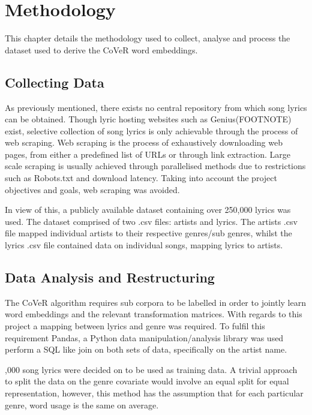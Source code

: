 \chapter{Methodology}
This chapter details the methodology used to collect, analyse and process the dataset used to derive the CoVeR word embeddings.
\label{chap:data_methodology}
\section{Collecting Data}
As previously mentioned, there exists no central repository from which song lyrics can be obtained. Though lyric hosting websites such as Genius(FOOTNOTE) exist, selective collection of song lyrics is only achievable through the process of web scraping. Web scraping is the process of exhaustively downloading web pages, from either a predefined list of URLs or through link extraction. Large scale scraping is usually achieved through parallelised methods due to restrictions such as Robots.txt and download latency. Taking into account the project objectives and goals, web scraping was avoided.

\noindent
\newline
In view of this, a publicly available dataset containing over 250,000 lyrics was used. The dataset comprised of two .csv files: artists and lyrics. The artists .csv file mapped individual artists to their respective genres/sub genres, whilst the lyrics .csv file contained data on individual songs, mapping lyrics to artists. 
\section{Data Analysis and Restructuring}
The CoVeR algorithm requires sub corpora to be labelled in order to jointly learn word embeddings and the relevant transformation matrices. With regards to this project a mapping between lyrics and genre was required. To fulfil this requirement Pandas, a Python data manipulation/analysis library was used  perform a SQL like join on both sets of data, specifically on the artist name.

\noindent
{},000 song lyrics were decided on to be used as training data. A trivial approach to split the data on the genre covariate would involve an equal split for equal representation, however, this method has the assumption that for each particular genre, word usage is the same on average. 

